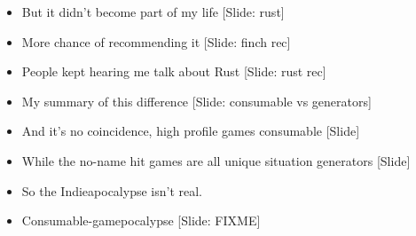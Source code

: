 \documentclass[12pt]{article}
\begin{document}
{\begin{itemize}
\item But it didn't become part of my life [Slide: rust]

\item More chance of recommending it [Slide:  finch rec]

\item People kept hearing me talk about Rust [Slide:  rust rec]

\item My summary of this difference [Slide: consumable vs generators]

\item And it's no coincidence, high profile games consumable [Slide]

\item While the no-name hit games are all unique situation generators [Slide]

\item So the Indieapocalypse isn't real.

\item Consumable-gamepocalypse [Slide:  FIXME]

\end{itemize}

}
\end{document}
